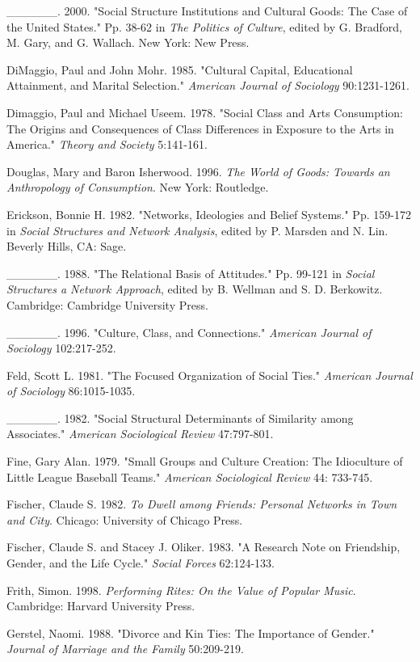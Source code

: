 \documentclass[
]{article}
\begin{document}
\_\_\_\_\_\_. 2000. "Social Structure Institutions and Cultural Goods: The Case of the United States." Pp. 38-62 in \emph{The Politics of Culture}, edited by G. Bradford, M. Gary, and G. Wallach. New York: New Press.

DiMaggio, Paul and John Mohr. 1985. "Cultural Capital, Educational Attainment, and Marital Selection." \emph{American Journal of Sociology} 90:1231-1261.

Dimaggio, Paul and Michael Useem. 1978. "Social Class and Arts Consumption: The Origins and Consequences of Class Differences in Exposure to the Arts in America." \emph{Theory and Society} 5:141-161.

Douglas, Mary and Baron Isherwood. 1996. \emph{The World of Goods: Towards an Anthropology of Consumption}. New York: Routledge.

Erickson, Bonnie H. 1982. "Networks, Ideologies and Belief Systems." Pp. 159-172 in \emph{Social Structures and Network Analysis}, edited by P. Marsden and N. Lin. Beverly Hills, CA: Sage.

\_\_\_\_\_\_. 1988. "The Relational Basis of Attitudes." Pp. 99-121 in \emph{Social Structures a Network Approach}, edited by B. Wellman and S. D. Berkowitz. Cambridge: Cambridge University Press.

\_\_\_\_\_\_. 1996. "Culture, Class, and Connections." \emph{American Journal of Sociology} 102:217-252.

Feld, Scott L. 1981. "The Focused Organization of Social Ties." \emph{American Journal of Sociology} 86:1015-1035.

\_\_\_\_\_\_. 1982. "Social Structural Determinants of Similarity among Associates." \emph{American Sociological Review} 47:797-801.

Fine, Gary Alan. 1979. "Small Groups and Culture Creation: The Idioculture of Little League Baseball Teams." \emph{American Sociological Review} 44: 733-745.

Fischer, Claude S. 1982. \emph{To Dwell among Friends: Personal Networks in Town and City}. Chicago: University of Chicago Press.

Fischer, Claude S. and Stacey J. Oliker. 1983. "A Research Note on Friendship, Gender, and the Life Cycle." \emph{Social Forces} 62:124-133.

Frith, Simon. 1998. \emph{Performing Rites: On the Value of Popular Music}. Cambridge: Harvard University Press.

Gerstel, Naomi. 1988. "Divorce and Kin Ties: The Importance of Gender." \emph{Journal of Marriage and the Family} 50:209-219.
\end{document}
